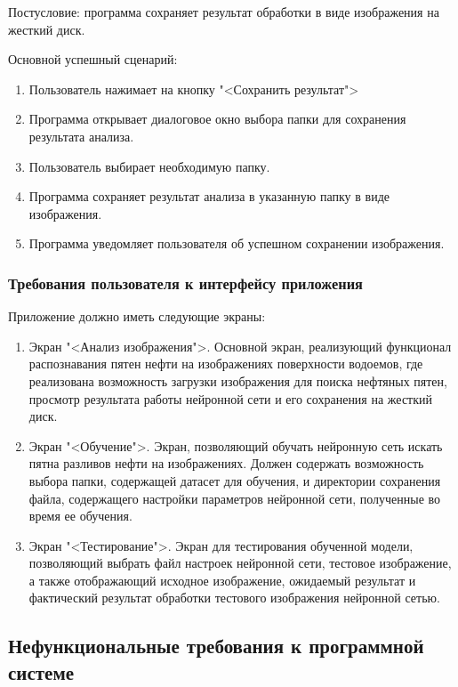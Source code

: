 Постусловие: программа сохраняет результат обработки в виде изображения на жесткий диск.

Основной успешный сценарий:

\begin{enumerate}
	\item Пользователь нажимает на кнопку "<Сохранить результат">
	\item Программа открывает диалоговое окно выбора папки для сохранения результата анализа.
	\item Пользователь выбирает необходимую папку.
	\item Программа сохраняет результат анализа в указанную папку в виде изображения.
	\item Программа уведомляет пользователя об успешном сохранении изображения.
\end{enumerate}

\subsubsection{Требования пользователя к интерфейсу приложения}

Приложение должно иметь следующие экраны:

\begin{enumerate}
	\item Экран "<Анализ изображения">. Основной экран, реализующий функционал распознавания пятен нефти на изображениях поверхности водоемов, где реализована возможность загрузки изображения для поиска нефтяных пятен, просмотр результата работы нейронной сети и его сохранения на жесткий диск.
	\item Экран "<Обучение">. Экран, позволяющий обучать нейронную сеть искать пятна разливов нефти на изображениях. Должен содержать возможность выбора папки, содержащей датасет для обучения, и директории сохранения файла, содержащего настройки параметров нейронной сети, полученные во время ее обучения.
	\item Экран "<Тестирование">. Экран для тестирования обученной модели, позволяющий выбрать файл настроек нейронной сети, тестовое изображение, а также отображающий исходное изображение, ожидаемый результат и фактический результат обработки тестового изображения нейронной сетью.
\end{enumerate}

\subsection{Нефункциональные требования к программной системе}

